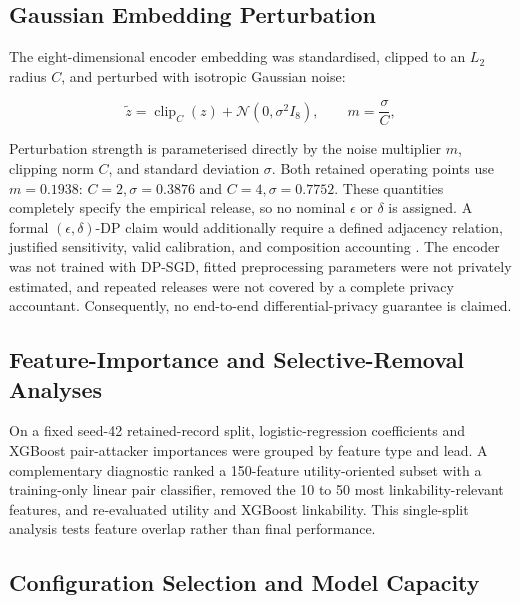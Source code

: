 \documentclass[journal]{IEEEtran}
\begin{document}
\subsection{Gaussian Embedding Perturbation}
\label{subsec:gaussian}

The eight-dimensional encoder embedding was standardised, clipped to an
$L_2$ radius $C$, and perturbed with isotropic Gaussian noise:

\begin{equation}
\widetilde{z}=\operatorname{clip}_{C}(z)+\mathcal{N}(0,\sigma^2 I_8),
\qquad
m=\frac{\sigma}{C},
\label{eq:gaussian}
\end{equation}

Perturbation strength is parameterised directly by the noise multiplier $m$,
clipping norm $C$, and standard deviation $\sigma$. Both retained operating
points use $m=0.1938$: $C=2,\sigma=0.3876$ and
$C=4,\sigma=0.7752$. These quantities completely specify the empirical
release, so no nominal $\epsilon$ or $\delta$ is assigned. A formal
$(\epsilon,\delta)$-DP claim would additionally require a defined adjacency
relation, justified sensitivity, valid calibration, and composition accounting
\cite{DworkRoth2014,BalleWang2018AnalyticGaussian}. The encoder was not
trained with DP-SGD, fitted preprocessing parameters were not privately
estimated, and repeated releases were not covered by a complete privacy
accountant. Consequently, no end-to-end differential-privacy guarantee is
claimed.

\subsection{Feature-Importance and Selective-Removal Analyses}
\label{subsec:feature-importance}

On a fixed seed-42 retained-record split, logistic-regression coefficients and
XGBoost pair-attacker importances were grouped by feature type and lead. A
complementary diagnostic ranked a 150-feature utility-oriented subset with a
training-only linear pair classifier, removed the 10 to 50 most
linkability-relevant features, and re-evaluated utility and XGBoost
linkability. This single-split analysis tests feature overlap rather than final
performance.

\subsection{Configuration Selection and Model Capacity}
\label{subsec:configuration-selection}
\end{document}
